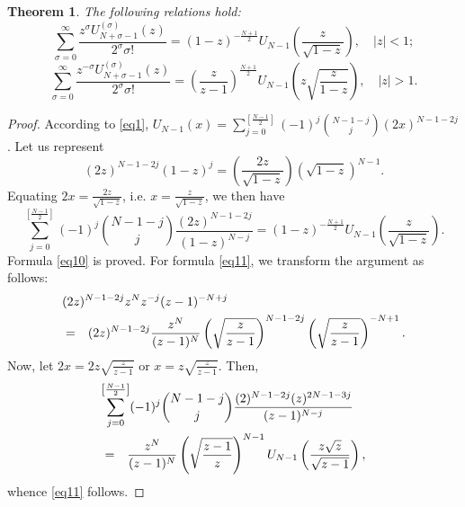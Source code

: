 \documentclass[10pt,a4paper]{amsart}
\newtheorem{thm}{Theorem}
\begin{document}
\begin{thm}\label{thm4}
The following relations hold:
\begin{equation}\label{eq10}
\sum_{\sigma = 0}^{\infty} \frac{z^\sigma U_{N+\sigma-1}^{(\sigma)}(z)}{2^\sigma \sigma!} = (1 - z)^{-\frac{N+1}{2}}U_{N-1}\left(\frac{z}{\sqrt{1-z}}\right), \quad |z| < 1;
\end{equation}
\begin{equation}\label{eq11}
\sum_{\sigma = 0}^{\infty} \frac{z^{-\sigma} U_{N+\sigma-1}^{(\sigma)}(z)}{2^\sigma \sigma!} = \left(\frac{z}{z-1}\right)^{\frac{N+1}{2}}U_{N-1}\left(z\sqrt{\frac{z}{1-z}}\right), \quad |z| > 1.
\end{equation}
\end{thm}

\begin{proof}
According to \eqref{eq1}, $\displaystyle U_{N-1}(x) = \sum_{j = 0}^{\left[\frac{N-1}{2}\right]}(-1)^j{N-1-j \choose j}(2x)^{N-1-2j}$. Let us represent
$$
(2z)^{N-1-2j}(1-z)^j = \left(\frac{2z}{\sqrt{1-z}}\right)(\sqrt{1-z})^{N-1}.
$$
Equating $2x = \frac{2z}{\sqrt{1-z}}$, i.e. $x = \frac{z}{\sqrt{1-z}}$, we then have
$$
\sum_{j = 0}^{\left[\frac{N-1}{2}\right]}(-1)^j{N-1-j \choose j}\frac{(2z)^{N-1-2j}}{(1-z)^{N-j}} = (1-z)^{-\frac{N+1}{2}}U_{N-1}\left(\frac{z}{\sqrt{1-z}}\right).
$$
Formula \eqref{eq10} is proved. For formula \eqref{eq11}, we transform the argument as follows:
\begin{eqnarray*}
\lefteqn{(2z)^{N-1-2j}z^Nz^{-j}(z-1)^{-N+j}} \\
&=& (2z)^{N-1-2j}\frac{z^N}{(z-1)^N}\left(\sqrt{\frac{z}{z-1}}\right)^{N-1-2j}\left(\sqrt{\frac{z}{z-1}}\right)^{-N+1}.
\end{eqnarray*}
Now, let $\displaystyle 2x = 2z\sqrt{\frac{z}{z-1}}$ or $\displaystyle x = z\sqrt{\frac{z}{z-1}}$. Then,
\begin{eqnarray*}
\lefteqn{\sum_{j = 0}^{\left[\frac{N-1}{2}\right]}(-1)^j{N-1-j \choose j}\frac{(2)^{N-1-2j}(z)^{2N-1-3j}}{(z-1)^{N-j}}} \\
&=& \frac{z^N}{(z - 1)^N}\left(\sqrt{\frac{z - 1}{z}}\right)^{N-1}U_{N-1}\left(\frac{z\sqrt{z}}{\sqrt{z - 1}}\right),
\end{eqnarray*}
whence \eqref{eq11} follows.
\end{proof}
\end{document}
